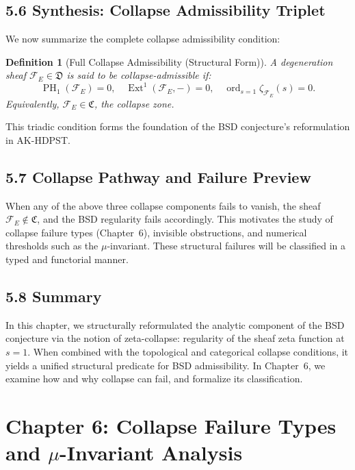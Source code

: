 \documentclass[11pt]{article}
\newtheorem{definition}[theorem]{Definition}
\DeclareMathOperator{\Ext}{Ext}
\DeclareMathOperator{\PH}{PH}
\newcommand{\ord}{\operatorname{ord}}
\begin{document}
\subsection*{5.6 Synthesis: Collapse Admissibility Triplet}

We now summarize the complete collapse admissibility condition:

\begin{definition}[Full Collapse Admissibility (Structural Form)]
\label{def:full-collapse}
A degeneration sheaf \( \mathcal{F}_E \in \mathfrak{D} \) is said to be \emph{collapse-admissible} if:
\[
\PH_1(\mathcal{F}_E) = 0, \quad \Ext^1(\mathcal{F}_E, -) = 0, \quad \ord_{s=1} \zeta_{\mathcal{F}_E}(s) = 0.
\]
Equivalently, \( \mathcal{F}_E \in \mathfrak{C} \), the collapse zone.
\end{definition}

This triadic condition forms the foundation of the BSD conjecture’s reformulation in AK-HDPST.

\subsection*{5.7 Collapse Pathway and Failure Preview}

When any of the above three collapse components fails to vanish, the sheaf \( \mathcal{F}_E \notin \mathfrak{C} \), and the BSD regularity fails accordingly. This motivates the study of collapse failure types (Chapter~6), invisible obstructions, and numerical thresholds such as the \( \mu \)-invariant. These structural failures will be classified in a typed and functorial manner.

\subsection*{5.8 Summary}

In this chapter, we structurally reformulated the analytic component of the BSD conjecture via the notion of zeta-collapse: regularity of the sheaf zeta function at \( s = 1 \). When combined with the topological and categorical collapse conditions, it yields a unified structural predicate for BSD admissibility. In Chapter~6, we examine how and why collapse can fail, and formalize its classification.



\section{Chapter 6: Collapse Failure Types and \(\mu\)-Invariant Analysis}
\label{sec:collapse-failure}
\end{document}
